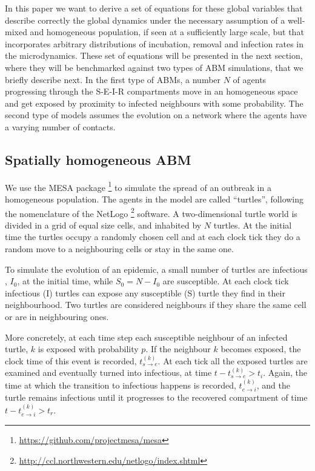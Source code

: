 \documentclass[10pt,letterpaper]{article}
\begin{document}
In this paper we want to derive a set of equations for these global variables that describe correctly the global dynamics under the necessary assumption of a well-mixed and homogeneous population, if seen at a sufficiently large scale, but that incorporates arbitrary distributions of incubation, removal and infection rates in the microdynamics. These set of equations will be presented in the next section, where they will be benchmarked against two types of ABM simulations, that we briefly describe next. In the first type of ABMs, a number $N$ of agents progressing through the S-E-I-R compartments move in an homogeneous space and get exposed by proximity to infected neighbours with some probability. The second type of models assumes the evolution  on a network where the agents have a varying number of contacts. 

\subsection*{Spatially homogeneous ABM}

We use the MESA package \footnote{\url{https://github.com/projectmesa/mesa}} to simulate the spread of an outbreak in a homogeneous population. The agents in the model are called ``turtles'', following the nomenclature of the NetLogo \footnote{\url{http://ccl.northwestern.edu/netlogo/index.shtml}} software. 
A two-dimensional turtle world is divided in a grid of equal size cells, and inhabited by $N$ turtles. At the initial time the turtles occupy a randomly chosen cell and  at each clock tick they do a random move to a neighbouring cells or stay in the same one. 

To simulate the evolution of an epidemic, a small number of turtles
are infectious , $I_0$, at the initial time, while $S_0 = N-I_0$ are
susceptible. At each clock tick infectious (I) turtles can  expose
 any susceptible (S) turtle they find in
their neighbourhood. Two turtles are considered neighbours if they
share the same cell or are in  neighbouring ones.  

More concretely, at each time step each susceptible neighbour of an infected
turtle, $k$ is exposed with probability $p$. If the neighbour $k$
becomes exposed, the clock time of
this event is recorded, $t_{s\rightarrow e}^{(k)}$. At each tick all
the exposed turtles are examined and eventually turned into infectious, at time
$t - t^{(k)}_{s\rightarrow e} > t_i$. 
Again,
the time at which the transition to infectious happens is recorded,
$t^{(k)}_{e\rightarrow i}$, and the turtle remains infectious until it
progresses to the recovered compartment of time $t - t^{(k)}_{e\rightarrow i} > t_r$.
\end{document}
